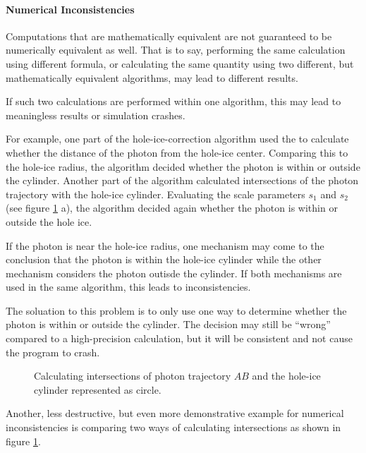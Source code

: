 \paragraph{Numerical Inconsistencies}
Computations that are mathematically equivalent are not guaranteed to be numerically equivalent as well. That is to say, performing the same calculation using different formula, or calculating the same quantity using two different, but mathematically equivalent algorithms, may lead to different results.

If such two calculations are performed within one algorithm, this may lead to meaningless results or simulation crashes.

For example, one part of the hole-ice-correction algorithm used the  to calculate whether the distance of the photon from the hole-ice center. Comparing this to the hole-ice radius, the algorithm decided whether the photon is within or outside the cylinder. Another part of the algorithm calculated intersections of the photon trajectory with the hole-ice cylinder. Evaluating the scale parameters $s_1$ and $s_2$ (see figure \ref{fig:aeQuae2U} a), the algorithm decided again whether the photon is within or outside the hole ice.

If the photon is near the hole-ice radius, one mechanism may come to the conclusion that the photon is within the hole-ice cylinder while the other mechanism considers the photon outisde the cylinder. If both mechanisms are used in the same algorithm, this leads to inconsistencies.

The soluation to this problem is to only use one way to determine whether the photon is within or outside the cylinder. The decision may still be ``wrong'' compared to a high-precision calculation, but it will be consistent and not cause the program to crash.

\begin{figure}[htbp]
  \caption{Calculating intersections of photon trajectory $AB$ and the hole-ice cylinder represented as circle.}
  \label{fig:aeQuae2U}
\end{figure}


Another, less destructive, but even more demonstrative example for numerical inconsistencies is comparing two ways of calculating intersections as shown in figure \ref{fig:aeQuae2U}.

